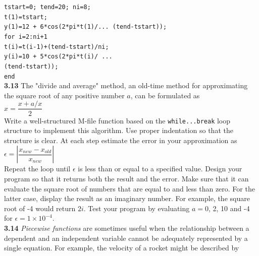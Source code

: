 \documentclass[../main.tex]{subfiles}
\begin{document}
\begin{multicols}{2}
    \texttt{\noindent tstart=0; tend=20; ni=8;\\
    \indent t(1)=tstart;\\
    \indent y(1)=12 + 6*cos(2*pi*t(1)/...
    \indent\hspace{25mm}(tend-tstart));\\
    \indent for i=2:ni+1\\
    \indent\hspace{2mm} t(i)=t(i-1)+(tend-tstart)/ni;\\
    \indent\hspace{2mm} y(i)=10 + 5*cos(2*pi*t(i)/ ...\\
    \indent\hspace{25mm} (tend-tstart));\\
    \indent end}\\

    \noindent\textbf{3.13} The "divide and average" method, an old-time method
    for approximating the square root of any positive number $a$,
    can be formulated as\\

    $x = \dfrac{x+a/x}{2}$\\

    \noindent
    Write a well-structured M-file function based on the
    \texttt{while...break} loop structure to implement this algorithm.
    Use proper indentation so that the structure is clear. At
    each step estimate the error in your approximation as\\

    $\epsilon = \left\lvert \dfrac{x_{new} - x_{old}}{x_{new}} \right\rvert $\\

    \noindent
    Repeat the loop until $\epsilon$ is less than or equal to a specified
    value. Design your program so that it returns both the result
    and the error. Make sure that it can evaluate the square root
    of numbers that are equal to and less than zero. For the latter
    case, display the result as an imaginary number. For example,
    the square root of -4 would return $2i$. Test your program
    by evaluating $a = 0$, 2, 10 and -4 for $\epsilon = 1 \times 10^{-4}$.\\

    \noindent\textbf{3.14} \emph{Piecewise functions} are sometimes useful when the relationship
    between a dependent and an independent variable
    cannot be adequately represented by a single equation. For
    example, the velocity of a rocket might be described by\\


\end{multicols}
\end{document}
